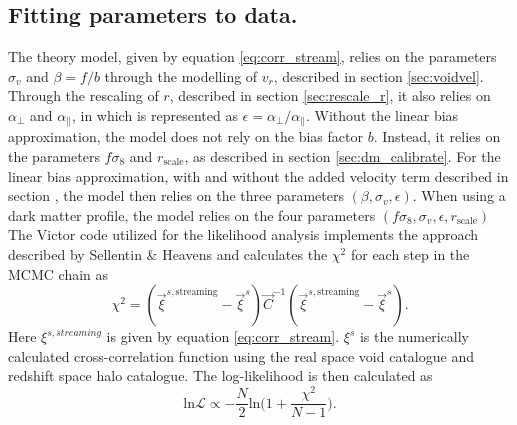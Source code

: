 \subsection{Fitting parameters to data.}
The theory model, given by equation \ref{eq:corr_stream}, relies on the parameters $\sigma_v$ and $\beta=f/b$ through the modelling of $v_r$, described in section \ref{sec:voidvel}. Through the rescaling of $r$, described in section \ref{sec:rescale_r}, it also relies on $\alpha_\perp$ and $\alpha_\parallel$, in which is represented as $\epsilon=\alpha_\perp/\alpha_\parallel$.
Without the linear bias approximation, the model does not rely on the bias factor $b$. Instead, it relies on the parameters $f\sigma_8$ and $r_\mathrm{scale}$, as described in section \ref{sec:dm_calibrate}. For the linear bias approximation, with and without the added velocity term described in section , the model then relies on the three parameters $(\beta,\sigma_v,\epsilon)$. When using a dark matter profile, the model relies on the four parameters $(f\sigma_8, \sigma_v, \epsilon, r_\mathrm{scale})$
\\\indent
The Victor code utilized for the likelihood analysis implements the approach described by Sellentin \& Heavens \cite{heavens2010statistical} and calculates the $\chi^2$ for each step in the MCMC chain as
\begin{equation}
    \chi^2=(\vec{\xi}^{s,\mathrm{streaming}}-\vec{\xi}^{s})\vec{C}^{-1}(\vec{\xi}^{s,\mathrm{streaming}}-\vec{\xi}^{s}).
\end{equation}
Here $\xi^{s,streaming}$ is given by equation \ref{eq:corr_stream}. $\xi^s$ is the numerically calculated cross-correlation function using the real space void catalogue and redshift space halo catalogue. The log-likelihood is then calculated as
\begin{equation}
    \mathrm{ln}\mathcal{L}\propto-\frac{N}{2}\mathrm{ln}\big(1+\frac{\chi^2}{N-1}\big).
\end{equation}
